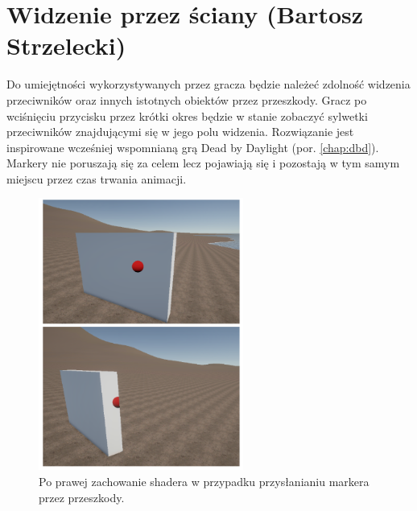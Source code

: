 \section{Widzenie przez ściany (Bartosz Strzelecki)}

Do umiejętności wykorzystywanych przez gracza będzie należeć zdolność widzenia przeciwników oraz innych istotnych obiektów przez przeszkody.
Gracz po wciśnięciu przycisku przez krótki okres będzie w stanie zobaczyć sylwetki przeciwników znajdującymi się w jego polu widzenia.
Rozwiązanie jest inspirowane wcześniej wspomnianą grą Dead by Daylight (por. \ref{chap:dbd}). Markery nie poruszają się za celem lecz pojawiają się i pozostają w tym samym miejscu przez czas trwania animacji.

\begin{figure}[h]
\centering
\includegraphics[width=0.6\textwidth]{images/shader}
\caption{Po prawej zachowanie shadera w przypadku przysłanianiu markera przez przeszkody.}
\end{figure}

